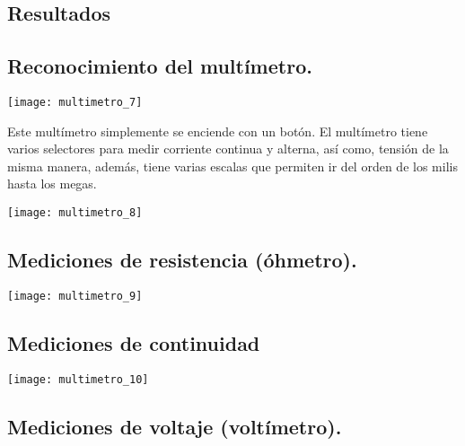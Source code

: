 \documentclass[11pt]{article}
\newenvironment{Figuras}
  {\par\medskip\noindent\minipage{\linewidth}}
  {\endminipage\par\medskip}
\begin{document}
\begin{multicols}{2}
\section{Resultados}
	\subsection{Reconocimiento del multímetro.}
	
\begin{Figuras}
	\centering
    \texttt{[image: multimetro\_7]}
    \label{fig:mesh7}
\end{Figuras}

Este multímetro simplemente se enciende con un botón. El multímetro tiene varios selectores para medir corriente continua y alterna, así como, tensión de la misma manera, además, tiene varias escalas que permiten ir del orden de los milis hasta los megas.

\begin{Figuras}
	\centering
    \texttt{[image: multimetro\_8]}
    \label{fig:mesh8}
\end{Figuras}

	\subsection{Mediciones de resistencia (óhmetro).}

\begin{Figuras}
	\centering
    \texttt{[image: multimetro\_9]}
\end{Figuras}

	\subsection{Mediciones de continuidad}

\begin{Figuras}
	\centering
    \texttt{[image: multimetro\_10]}
    \label{fig:mesh9}
\end{Figuras}
	
	\subsection{Mediciones de voltaje (voltímetro).}


\end{multicols}
\end{document}
